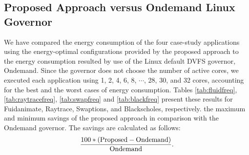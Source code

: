 \subsection{Proposed Approach versus Ondemand Linux Governor}
\label{sec:proposedapproach}
We have compared the energy consumption of the four case-study applications using the energy-optimal configurations provided by the proposed approach to the energy consumption resulted by use of the Linux default DVFS governor, Ondemand. Since the governor does not choose the number of active cores, we executed each application using 1, 2, 4, 6, 8, $\cdots$, 28, 30, and 32 cores, accounting for the best and the worst cases of energy consumption. Tables \ref{tab:fluidfreq}, \ref{tab:raytracefreq}, \ref{tab:swapfreq} and \ref{tab:blackfreq} present these results for Fuidanimate, Raytrace, Swaptions, and Blackscholes, respectively. the maximum and minimum savings of the proposed approach in comparison with the Ondemand governor. The savings are calculated as follows: 
\begin{equation}
    \frac{100*({\rm Proposed}-{\rm Ondemand})}{\rm Ondemand}.
\end{equation}

